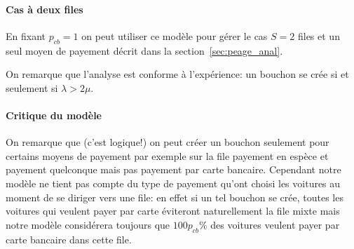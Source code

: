 \documentclass{scrartcl}
\begin{document}
      \paragraph{Cas à deux files}
        En fixant $p_{cb} = 1$ on peut utiliser ce modèle pour gérer le cas
        $S=2$ files et un seul moyen de payement décrit dans la
        section~\ref{sec:peage_anal}.

        On remarque que l'analyse est conforme à l'expérience: un bouchon se
        crée si et seulement si $\lambda > 2\mu$.

      \paragraph{Critique du modèle}
        On remarque que (c'est logique!) on peut créer un bouchon seulement
        pour certains moyens de payement par exemple sur la file payement en
        espèce et payement quelconque mais pas payement par carte bancaire.
        Cependant notre modèle ne tient pas compte du type de payement qu'ont
        choisi les voitures au moment de se diriger vers une file: en effet si
        un tel bouchon se crée, toutes les voitures qui veulent payer par carte
        éviteront naturellement la file mixte mais notre modèle considérera
        toujours que $100 p_{cb}\%$ des voitures veulent payer par carte
        bancaire dans cette file.
\end{document}
